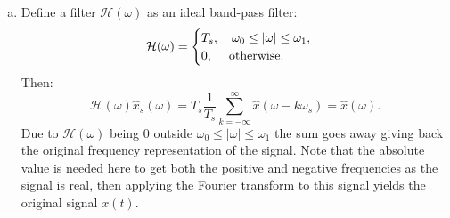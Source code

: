 \begin{enumerate}
\begin{enumerate}[a)]
\item Define a filter $\mathcal{H}(\omega)$ as an ideal band-pass filter:
$$\mathcal{H}(\omega)=\begin{cases}
    T_{s}, \quad \omega_{0}\le|\omega|\le\omega_{1}, \\
    0, \quad \hspace{0.1cm}\text{otherwise}.
\end{cases}$$
Then:
$$\mathcal{H}(\omega)\hat{x}_{s}(\omega)=T_{s}\frac{1}{T_{s}}\sum_{k=-\infty}^{\infty}\hat{x}(\omega-k\omega_{s})=\hat{x}(\omega).$$
Due to $\mathcal{H}(\omega)$ being $0$ outside $\omega_{0}\le|\omega|\le\omega_{1}$ the sum goes away giving back the original frequency representation of the signal. 
Note that the absolute value is needed here to get both the positive and negative frequencies as the signal is real, 
then applying the Fourier transform to this signal yields the original signal $x(t)$. 
\end{enumerate}

















\end{enumerate}

